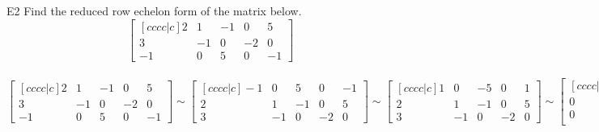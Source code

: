 \begin{problem}{E2}
Find the reduced row echelon form of the matrix below.
$$\begin{bmatrix}[cccc|c] 2 & 1 & -1 & 0 & 5 \\ 3 & -1 & 0 & -2 & 0 \\ -1 & 0 & 5 & 0 & -1 \end{bmatrix}$$
\end{problem}
\begin{solution}
$$\begin{bmatrix}[cccc|c]
 2 & 1 & -1 & 0 & 5 \\
 3 & -1 & 0 & -2 & 0 \\
 -1 & 0 & 5 & 0 & -1
\end{bmatrix} \sim
\begin{bmatrix}[cccc|c]
 -1 & 0 & 5 & 0 & -1  \\
 2 & 1 & -1 & 0 & 5 \\
 3 & -1 & 0 & -2 & 0
\end{bmatrix} \sim
\begin{bmatrix}[cccc|c]
 1 & 0 & -5 & 0 & 1 \\
 2 & 1 & -1 & 0 & 5 \\
 3 & -1 & 0 & -2 & 0
\end{bmatrix} \sim
\begin{bmatrix}[cccc|c]
 1 & 0 & -5 & 0 & 1  \\
 0 & 1 & 9 & 0 & 3 \\
 0 & -1 & 15 & -2 & -3 \\
\end{bmatrix} \sim
\begin{bmatrix}[cccc|c]
 1 & 0 & -5 & 0 & 1  \\
 0 & 1 & 9 & 0 & 3 \\
 0 & 0 & 24 & -2 & 0 \\
\end{bmatrix} \sim
\begin{bmatrix}[cccc|c]
 1 & 0 & -5 & 0 & 1 \\
 0 & 1 & 9 & 0 & 3 \\
 0 & 0 & 1 & -\frac{1}{12} & 0 \\
\end{bmatrix} \sim
\begin{bmatrix}[cccc|c]
1 & 0 & 0 & -\frac{5}{12} & 1 \\
 0 & 1 & 0 & \frac{3}{4} & 3 \\
 0 & 0 & 1 & -\frac{1}{12} & 0
\end{bmatrix}$$
\end{solution}

